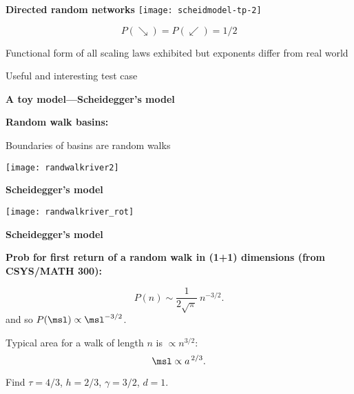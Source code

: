 \begin{frame}[label=]
\begin{frame}[label=]
\begin{frame}[label=]
\begin{frame}[label=]
\begin{frame}[label=]
\begin{frame}[label=]
\begin{frame}[label=]
\begin{frame}[label=]
\begin{frame}[label=]
\begin{frame}[label=]
\begin{frame}[label=]
\begin{frame}[label=]
\begin{frame}[label=]
\begin{frame}[label=]
\begin{frame}[label=]
\begin{frame}[label=]
\begin{frame}[label=]
\begin{frame}[label=]
\begin{frame}[label=]
\begin{frame}[label=]
\begin{frame}[label=]
\begin{frame}[label=]
\begin{frame}[label=]
\begin{frame}[label=]
\begin{frame}[label=]
\begin{frame}[label=]
\begin{frame}[label=]
\begin{frame}[label=]
\begin{frame}[label=]
\begin{frame}[label=]
\begin{frame}[label=]
\begin{frame}[label=]
\begin{frame}[label=]
\begin{frame}[label=]
\begin{frame}[label=]
\begin{frame}[label=]
  \textbf{Directed random networks\cite{scheidegger1967a,scheidegger1991a}}
    \texttt{[image: scheidmodel-tp-2]}
    
    
      $$P(\searrow) = P (\swarrow) = 1/2$$
    
      Functional form of all scaling laws exhibited
      but exponents differ from real world\cite{takayasu1988a,takayasu1989a,takayasu1989b}
    
      Useful and interesting test case
    
  

\begin{frame}[label=]
  \textbf{A toy model---Scheidegger's model}

  \textbf{Random walk basins:}
    
    Boundaries of basins are random walks
    
    \texttt{[image: randwalkriver2]}
  

\begin{frame}[label=]
  \textbf{Scheidegger's model}

  \begin{center}
    \texttt{[image: randwalkriver\_rot]}
  \end{center}


\begin{frame}[label=]
  \textbf{Scheidegger's model}

  \textbf{Prob for first return of a random walk in (1+1) dimensions (from CSYS/MATH 300):}
  
    
      $$P(n) \sim \frac{1}{2\sqrt{\pi}}\  n^{-3/2}.$$
      and so $P(\msl) \propto \msl^{-3/2}$.
    
      Typical area for a walk of length $n$ is $\propto n^{3/2}$:
      $$ \msl \propto a^{\, 2/3}.$$
    
      Find $\tau=4/3$, $h=2/3$, $\gamma = 3/2$, $d=1$.
    

\end{frame}
\end{frame}
\end{frame}
\end{frame}
\end{frame}
\end{frame}
\end{frame}
\end{frame}
\end{frame}
\end{frame}
\end{frame}
\end{frame}
\end{frame}
\end{frame}
\end{frame}
\end{frame}
\end{frame}
\end{frame}
\end{frame}
\end{frame}
\end{frame}
\end{frame}
\end{frame}
\end{frame}
\end{frame}
\end{frame}
\end{frame}
\end{frame}
\end{frame}
\end{frame}
\end{frame}
\end{frame}
\end{frame}
\end{frame}
\end{frame}
\end{frame}
\end{frame}
\end{frame}
\end{frame}
